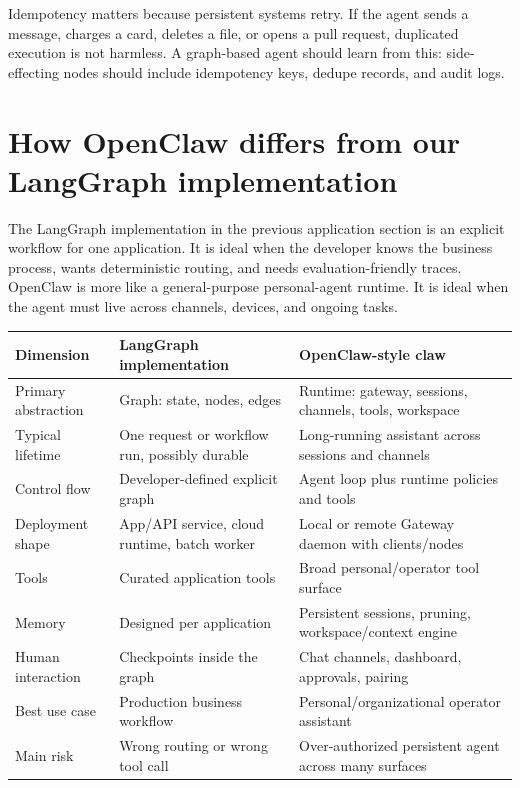 Idempotency matters because persistent systems retry. If the agent sends a message, charges a card, deletes a file, or opens a pull request, duplicated execution is not harmless. A graph-based agent should learn from this: side-effecting nodes should include idempotency keys, dedupe records, and audit logs.

\section{How OpenClaw differs from our LangGraph implementation}

The LangGraph implementation in the previous application section is an explicit workflow for one application. It is ideal when the developer knows the business process, wants deterministic routing, and needs evaluation-friendly traces. OpenClaw is more like a general-purpose personal-agent runtime. It is ideal when the agent must live across channels, devices, and ongoing tasks.

\begin{longtable}{p{}p{}p{}}
\toprule
\textbf{Dimension} & \textbf{LangGraph implementation} & \textbf{OpenClaw-style claw} \\
\midrule
Primary abstraction & Graph: state, nodes, edges & Runtime: gateway, sessions, channels, tools, workspace \\
Typical lifetime & One request or workflow run, possibly durable & Long-running assistant across sessions and channels \\
Control flow & Developer-defined explicit graph & Agent loop plus runtime policies and tools \\
Deployment shape & App/API service, cloud runtime, batch worker & Local or remote Gateway daemon with clients/nodes \\
Tools & Curated application tools & Broad personal/operator tool surface \\
Memory & Designed per application & Persistent sessions, pruning, workspace/context engine \\
Human interaction & Checkpoints inside the graph & Chat channels, dashboard, approvals, pairing \\
Best use case & Production business workflow & Personal/organizational operator assistant \\
Main risk & Wrong routing or wrong tool call & Over-authorized persistent agent across many surfaces \\
\bottomrule
\end{longtable}

